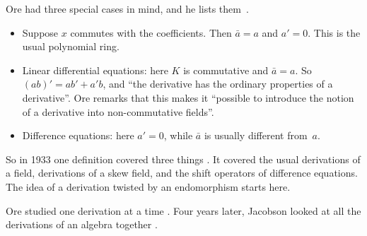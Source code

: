 Ore had three special cases in mind, and he lists them~\cite[p.~482]{Ore1933}.
\begin{itemize}
\item Suppose $x$ commutes with the coefficients. Then $\bar a = a$ and
  $a' = 0$. This is the usual polynomial ring.
\item Linear differential equations: here $K$ is commutative and
  $\bar a = a$. So $(ab)' = ab' + a'b$, and ``the derivative has the ordinary
  properties of a derivative''. Ore remarks that this makes it ``possible to
  introduce the notion of a derivative into non-commutative fields''.
\item Difference equations: here $a' = 0$, while $\bar a$ is usually
  different from~$a$.
\end{itemize}

So in 1933 one definition covered three things \cite[p.~482]{Ore1933}. It
covered the usual derivations of a field, derivations of a skew field, and the
shift operators of difference equations. The idea of a derivation twisted by
an endomorphism starts here.

Ore studied one derivation at a time \cite[p.~480]{Ore1933}. Four years
later, Jacobson looked at all the derivations of an algebra together
\cite[p.~206]{Jacobson1937}.
